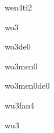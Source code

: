 \begin{multicols}{2}
\begin{hanzi}[问题]{wen4ti2}
\end{hanzi}

\begin{hanzi}[我]{wo3}
\end{hanzi}

\begin{hanzi}[我的]{wo3de0}
\end{hanzi}

\begin{hanzi}[我们]{wo3men0}
\end{hanzi}

\begin{hanzi}[我们的]{wo3men0de0}
\end{hanzi}

\begin{hanzi}[午饭]{wu3fan4}
\end{hanzi}

\begin{hanzi}[五]{wu3}
\end{hanzi}

\end{multicols}
